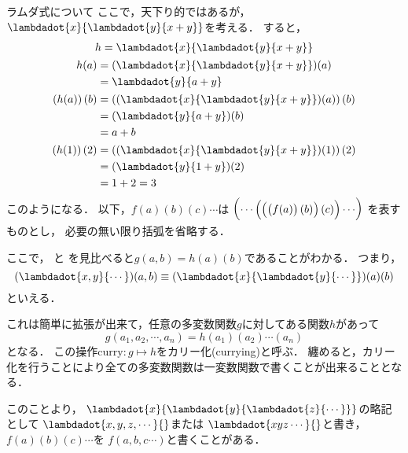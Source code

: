 \documentclass[a4paper,titlepage,report]{jsbook}
\begin{document}
\begin{resbonsiblesection}{ラムダ式について}{\sakamoto}
ここで，天下り的ではあるが，$\lambdadot{x}{\lambdadot{y}{x+y}}$を考える．
すると，
\begin{gather}
\begin{aligned}
\label{eq:lambda-curried}
h &= \lambdadot{x}{\lambdadot{y}{x+y}} \\
\end{aligned} \\
\begin{aligned}
\label{eq:lambda-curried-partial}
h(a) &= (\lambdadot{x}{\lambdadot{y}{x+y}})(a)\\
     &= {\lambdadot{y}{a+y}}
\end{aligned} \\
\begin{aligned}
\label{eq:lambda-curried-inst}
\left(h(a)\right)(b) &= \left((\lambdadot{x}{\lambdadot{y}{x+y}})(a)\right)(b) \\
        &= (\lambdadot{y}{a+y})(b)\\
        &= a + b
\end{aligned} \\
\begin{aligned}
\left(h(1)\right)(2) &= \left((\lambdadot{x}{\lambdadot{y}{x+y}})(1)\right)(2) \\
        &= (\lambdadot{y}{1+y})(2) \\
        &= 1 + 2 = 3
\end{aligned}
\end{gather}
このようになる．
以下，$f(a)(b)(c)\cdots$は
$\delimitershortfall-1pt\left({\cdots\left({\left({\left({f(a)}\right)(b)}\right)(c)}\right)\cdots}\right)$
を表すものとし，
必要の無い限り括弧を省略する．

ここで，
と
を見比べると$g(a, b) = h(a)(b)$であることがわかる．
つまり，
\begin{equation}
(\lambdadot{x,y}{\cdots})(a,b) \equiv (\lambdadot{x}{\lambdadot{y}{\cdots}})(a)(b)
\end{equation}
といえる．

これは簡単に拡張が出来て，任意の多変数関数$g$に対してある関数$h$があって
\begin{equation}
g(a_1, a_2, \cdots, a_n)= h(a_1)(a_2)\cdots(a_n)
\end{equation}
となる．
この操作$\mathrm{curry}: g\mapsto h$をカリー化(currying)と呼ぶ．
纏めると，カリー化を行うことにより全ての多変数関数は一変数関数で書くことが出来ることとなる．

このことより，
$\lambdadot{x}{\lambdadot{y}{\lambdadot{z}{\cdots}}}$の略記として
$\lambdadot{x,y,z,\cdots}{}$または
$\lambdadot{xyz\cdots}{}$と書き，
$f(a)(b)(c)\cdots$を
$f(a,b,c\cdots)$と書くことがある．


\end{resbonsiblesection}
\end{document}
